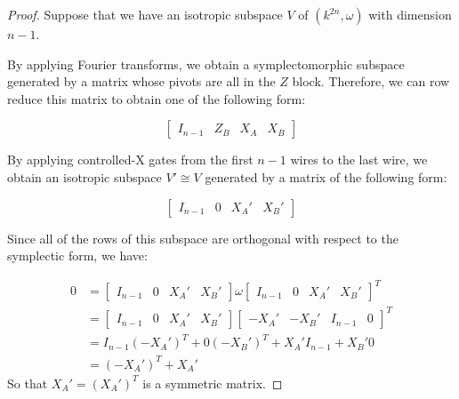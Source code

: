 \begin{proof}
Suppose that we have an isotropic subspace $V$ of $(k^{2n},\omega)$ with dimension $n-1$. 

By applying Fourier transforms, we obtain a symplectomorphic subspace generated by a matrix whose pivots are all in the $Z$ block.  Therefore, we can row reduce this matrix to obtain one of the following form:

$$
\left[\begin{array}{cc|cc}
I_{n-1} & Z_B & X_A & X_B 
\end{array}\right]
$$

By applying controlled-{\cal X} gates from the first $n-1$ wires to the last wire, we obtain an isotropic subspace $V'\cong V$ generated by a matrix of the following form:


$$
\left[\begin{array}{cc|cc}
I_{n-1} & 0 & X_A' & X_B' 
\end{array}\right]
$$

Since all of the rows of this subspace are orthogonal with respect to the symplectic form, we have:

\begin{align*}
0 &=
\left[\begin{array}{cc|cc}
I_{n-1} & 0 & X_A' & X_B' 
\end{array}\right]
\omega
\left[\begin{array}{cc|cc}
I_{n-1} & 0 & X_A' & X_B' 
\end{array}\right]^T\\
&=
\left[\begin{array}{cc|cc}
I_{n-1} & 0 & X_A' & X_B' 
\end{array}\right]
\left[\begin{array}{cc|cc}
 -X_A' & -X_B'  & I_{n-1} & 0
\end{array}\right]^T\\
&=
I_{n-1}(-X_A')^T +  0( -X_B' )^T +X_A'I_{n-1} + X_B' 0 \\
&=
(-X_A')^T +X_A'
\end{align*}
So that  $X_A'=(X_A')^T$ is a symmetric matrix.


\end{proof}
